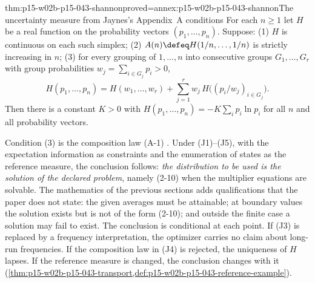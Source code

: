 \begin{hbtheorem}{thm:p15-w02b-p15-043-shannon}{proved=annex:p15-w02b-p15-043-shannon}{The uncertainty measure from Jaynes's Appendix~A conditions}
For each \(n\geq1\) let \(H\) be a real function on the probability vectors
\((p_1,\ldots,p_n)\). Suppose:
(1) \(H\) is continuous on each such simplex;
(2) \(A(n)\defeq H(1/n,\ldots,1/n)\) is strictly increasing in \(n\);
(3) for every grouping of \(1,\ldots,n\) into consecutive groups
\(G_1,\ldots,G_r\) with group probabilities
\(w_j=\sum_{i\in G_j}p_i>0\),
\[
 H(p_1,\ldots,p_n)=H(w_1,\ldots,w_r)+\sum_{j=1}^rw_j\,H\bigl((p_i/w_j)_{i\in G_j}\bigr).
\]
Then there is a constant \(K>0\) with
\(H(p_1,\ldots,p_n)=-K\sum_ip_i\ln p_i\) for all \(n\) and all probability
vectors.
\end{hbtheorem}

Condition (3) is the composition law (A-1)
\cite[p.~630]{Jaynes1957InformationTheory}. Under (J1)--(J5), with the
expectation information as constraints and the enumeration of states as the
reference measure, the conclusion follows: \emph{the distribution to be used
is the solution of the declared problem}, namely (2-10) when the multiplier
equations are solvable. The mathematics of the previous sections adds
qualifications that the paper does not state: the given averages must be
attainable; at boundary values the solution exists but is not of the form
(2-10); and outside the finite case a solution may fail to exist. The
conclusion is conditional at each point. If (J3) is replaced by a frequency
interpretation, the optimizer carries no claim about long-run frequencies.
If the composition law in (J4) is rejected, the uniqueness of \(H\) lapses.
If the reference measure is changed, the conclusion changes with it
(\cref{thm:p15-w02b-p15-043-transport,def:p15-w02b-p15-043-reference-example}).

